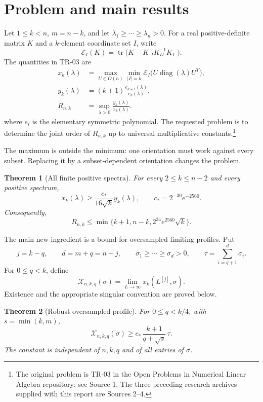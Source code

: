 \documentclass[11pt]{article}
\newtheorem{theorem}{Theorem}[section]
\theoremstyle{remark}\newtheorem{remark}[theorem]{Remark}
\newcommand{\tr}{\operatorname{tr}}
\newcommand{\diag}{\operatorname{diag}}
\newcommand{\X}{\mathcal X}
\newcommand{\Err}{\mathcal E}
\newcommand{\cstar}{c_*}
\begin{document}
\section{Problem and main results}
Let $1\le k<n$, $m=n-k$, and let $\lambda_1\ge\cdots\ge\lambda_n>0$. For a real positive-definite matrix $K$ and a $k$-element coordinate set $I$, write
\[
 \Err_I(K)=\tr\bigl(K-K_{:I}K_{II}^{-1}K_{I:}\bigr).
\]
The quantities in TR-03 are
\begin{align*}
 x_k(\lambda)&=\max_{U\in O(n)}\min_{|I|=k}
 \Err_I\bigl(U\diag(\lambda)U^T\bigr),\\
 y_k(\lambda)&=(k+1)\frac{e_{k+1}(\lambda)}{e_k(\lambda)},\\
 R_{n,k}&=\sup_{\lambda>0}\frac{y_k(\lambda)}{x_k(\lambda)}.
\end{align*}
where $e_i$ is the elementary symmetric polynomial. The requested problem is to determine the joint order of $R_{n,k}$ up to universal multiplicative constants.\footnote{The original problem is TR-03 in the Open Problems in Numerical Linear Algebra repository; see Source 1. The three preceding research archives supplied with this report are Sources 2--4.}

The maximum is outside the minimum: one orientation must work against every subset. Replacing it by a subset-dependent orientation changes the problem.

\begin{theorem}[All finite positive spectra]\label{th:main}
For every $2\le k\le n-2$ and every positive spectrum,
\[
 x_k(\lambda)\ge \frac{\cstar}{16\sqrt{k}}y_k(\lambda),
 \qquad \cstar=2^{-30}e^{-2560}.
\]
Consequently,
\[
 R_{n,k}\le\min\{k+1,n-k,2^{34}e^{2560}\sqrt{k}\}.
\]
\end{theorem}

The main new ingredient is a bound for oversampled limiting profiles. Put
\[
 j=k-q,\qquad d=m+q=n-j,\qquad
 \sigma_1\ge\cdots\ge\sigma_d>0,
 \qquad \tau=\sum_{i=q+1}^d\sigma_i.
\]
For $0\le q<k$, define
\[
 \X_{n,k,q}(\sigma)
 =\lim_{L\to\infty}x_k(L^{[j]},\sigma).
\]
Existence and the appropriate singular convention are proved below.

\begin{theorem}[Robust oversampled profile]\label{th:robust}
For $0\le q<k/4$, with $s=\min(k,m)$,
\[
 \boxed{\displaystyle
 \X_{n,k,q}(\sigma)\ge
 \cstar\,\frac{k+1}{q+\sqrt{s}}\,\tau.}
\]
The constant is independent of $n,k,q$ and of all entries of $\sigma$.
\end{theorem}
\end{document}
